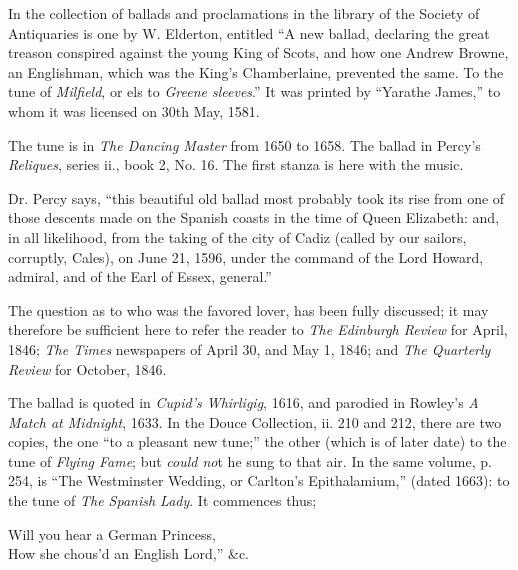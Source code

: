 


In the collection of ballads and proclamations in the library of the Society of
Antiquaries is one by W. Elderton, entitled “A new ballad, declaring the great
treason conspired against the young King of Scots, and how one Andrew Browne,
an Englishman, which was the King’s Chamberlaine, prevented the same. To the
tune of \textit{Milfield}, or els to \textit{Greene sleeves}.” It was printed by “Yarathe James,”
to whom it was licensed on 30th May, 1581.

The tune is in \textit{The Dancing Master} from 1650 to 1658. The ballad in Percy’s
\textit{Reliques}, series ii., book 2, No. 16. The first stanza is here with the music.

\pagebreak



\vspace{-2\baselineskip}


Dr. Percy says, “this beautiful old ballad most probably took its rise from one
of those descents made on the Spanish coasts in the time of Queen Elizabeth:
and, in all likelihood, from the taking of the city of Cadiz (called by our sailors,
corruptly, Cales), on June 21, 1596, under the command of the Lord Howard,
admiral, and of the Earl of Essex, general.”

The question as to who was the favored lover, has been fully discussed; it may
therefore be sufficient here to refer the reader to \textit{The Edinburgh Review} for April,
1846; \textit{The Times} newspapers of April 30, and May 1, 1846; and \textit{The Quarterly
Review} for October, 1846.

The ballad is quoted in \textit{Cupid’s Whirligig}, 1616, and parodied in Rowley’s
\textit{A Match at Midnight}, 1633. In the Douce Collection, ii. 210 and 212, there
are two copies, the one “to a pleasant new tune;” the other (which is of later
date) to the tune of \textit{Flying Fame}; but \textit{could no}t he sung to that air. In the
same volume, p. 254, is “The Westminster Wedding, or Carlton’s Epithalamium,”
(dated 1663): to the tune of \textit{The Spanish Lady}. It commences thus;

\settowidth{\versewidth}{Will you hear a German Princess,}
\begin{scverse}
Will you hear a German Princess,\\
How she chous’d an English Lord,” \&c.
\end{scverse}

